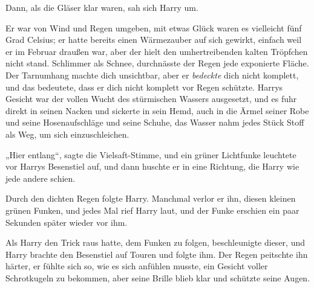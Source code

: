 Dann, als die Gläser klar waren, sah sich Harry um.

Er war von Wind und Regen umgeben, mit etwas Glück waren es vielleicht fünf Grad Celsius; er hatte bereits einen Wärmezauber auf sich gewirkt, einfach weil er im Februar draußen war, aber der hielt den umhertreibenden kalten Tröpfchen nicht stand. Schlimmer als Schnee, durchnässte der Regen jede exponierte Fläche. Der Tarnumhang machte dich unsichtbar, aber er \emph{bedeckte} dich nicht komplett, und das bedeutete, dass er dich nicht komplett vor Regen schützte. Harrys Gesicht war der vollen Wucht des stürmischen Wassers ausgesetzt, und es fuhr direkt in seinen Nacken und sickerte in sein Hemd, auch in die Ärmel seiner Robe und seine Hosenaufschläge und seine Schuhe, das Wasser nahm jedes Stück Stoff als Weg, um sich einzuschleichen.

„Hier entlang“, sagte die Vielsaft-Stimme, und ein grüner Lichtfunke leuchtete vor Harrys Besenstiel auf, und dann huschte er in eine Richtung, die Harry wie jede andere schien.

Durch den dichten Regen folgte Harry. Manchmal verlor er ihn, diesen kleinen grünen Funken, und jedes Mal rief Harry laut, und der Funke erschien ein paar Sekunden später wieder vor ihm.

Als Harry den Trick raus hatte, dem Funken zu folgen, beschleunigte dieser, und Harry brachte den Besenstiel auf Touren und folgte ihm. Der Regen peitschte ihn härter, er fühlte sich so, wie es sich anfühlen musste, ein Gesicht voller Schrotkugeln zu bekommen, aber seine Brille blieb klar und schützte seine Augen.

